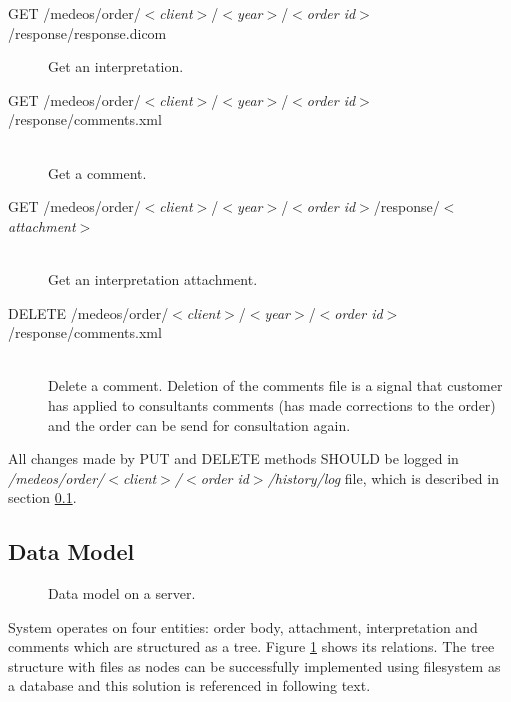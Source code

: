 \documentclass[a4paper]{article}
\begin{document}
\begin{description}
  \item[GET /medeos/order/$<$\emph{client}$>$/$<$\emph{year}$>$/$<$\emph{order id}$>$/response/response.dicom] 
  Get an interpretation.
  
  \item[GET /medeos/order/$<$\emph{client}$>$/$<$\emph{year}$>$/$<$\emph{order id}$>$/response/comments.xml] \hfill \\
  Get a comment.

  \item[GET /medeos/order/$<$\emph{client}$>$/$<$\emph{year}$>$/$<$\emph{order id}$>$/response/$<$\emph{attachment}$>$] \hfill \\ 
  Get an interpretation attachment.

  \item[DELETE /medeos/order/$<$\emph{client}$>$/$<$\emph{year}$>$/$<$\emph{order id}$>$/response/comments.xml]\hfill \\ 
  Delete a comment. Deletion of the comments file is a signal that customer has applied to
  consultants comments (has made corrections to the order) and the order can be send
  for consultation again.

\end{description}

All changes made by PUT and DELETE methods SHOULD be logged in
\emph{/medeos/order/$<$\emph{client}$>$/$<$\emph{order id}$>$/history/log} file, which is
described in section \ref{sec:model}.

\subsection{Data Model}
\label{sec:model}
\begin{figure}
\centering
{}
\caption{\label{fig:modeldanych}Data model on a server.}
\end{figure}

System operates on four entities: order body, attachment, interpretation and comments which
are structured as a tree. Figure \ref{fig:modeldanych} shows its relations.
The tree structure with files as nodes can be successfully implemented using
filesystem as a database and this solution is referenced in following text. 
\end{document}
